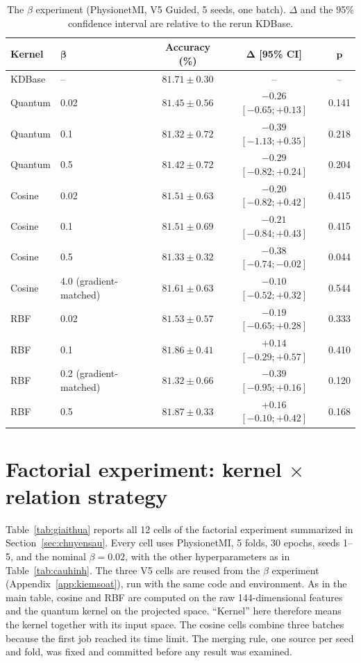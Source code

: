 \begin{table}[!htbp]
\centering
\caption{The $\beta$ experiment (PhysionetMI, V5 Guided, 5 seeds, one
batch). $\Delta$ and the 95\% confidence interval are relative to the
rerun KDBase.}
\label{tab:betagrid}
\small
\begin{tabular}{llccc}
\toprule
\textbf{Kernel} & $\boldsymbol{\beta}$ & \textbf{Accuracy (\%)} & $\boldsymbol{\Delta}$ \textbf{[95\% CI]} & $\boldsymbol{p}$ \\
\midrule
KDBase & -- & $81.71 \pm 0.30$ & -- & -- \\
\midrule
Quantum & 0.02 & $81.45 \pm 0.56$ & $-0.26$ $[-0.65; +0.13]$ & 0.141 \\
Quantum & 0.1 & $81.32 \pm 0.72$ & $-0.39$ $[-1.13; +0.35]$ & 0.218 \\
Quantum & 0.5 & $81.42 \pm 0.72$ & $-0.29$ $[-0.82; +0.24]$ & 0.204 \\
\midrule
Cosine & 0.02 & $81.51 \pm 0.63$ & $-0.20$ $[-0.82; +0.42]$ & 0.415 \\
Cosine & 0.1 & $81.51 \pm 0.69$ & $-0.21$ $[-0.84; +0.43]$ & 0.415 \\
Cosine & 0.5 & $81.33 \pm 0.32$ & $-0.38$ $[-0.74; -0.02]$ & 0.044 \\
Cosine & 4.0 (gradient-matched) & $81.61 \pm 0.63$ & $-0.10$ $[-0.52; +0.32]$ & 0.544 \\
\midrule
RBF & 0.02 & $81.53 \pm 0.57$ & $-0.19$ $[-0.65; +0.28]$ & 0.333 \\
RBF & 0.1 & $81.86 \pm 0.41$ & $+0.14$ $[-0.29; +0.57]$ & 0.410 \\
RBF & 0.2 (gradient-matched) & $81.32 \pm 0.66$ & $-0.39$ $[-0.95; +0.16]$ & 0.120 \\
RBF & 0.5 & $81.87 \pm 0.33$ & $+0.16$ $[-0.10; +0.42]$ & 0.168 \\
\bottomrule
\end{tabular}
\end{table}
\FloatBarrier

\section{Factorial experiment: kernel $\times$ relation strategy}
\label{app:giaithua}

Table~\ref{tab:giaithua} reports all 12 cells of the factorial experiment
summarized in Section~\ref{sec:chuyensau}. Every cell uses PhysionetMI,
5 folds, 30 epochs, seeds 1--5, and the nominal $\beta = 0.02$, with the
other hyperparameters as in Table~\ref{tab:cauhinh}. The three V5 cells are
reused from the $\beta$ experiment (Appendix~\ref{app:kiemsoat}), run with
the same code and environment. As in the main table, cosine and RBF are
computed on the raw 144-dimensional features and the quantum kernel on the
projected space. ``Kernel'' here therefore means the kernel together with
its input space. The cosine cells combine three batches because the first
job reached its time limit. The merging rule, one source per seed and
fold, was fixed and committed before any result was examined.

